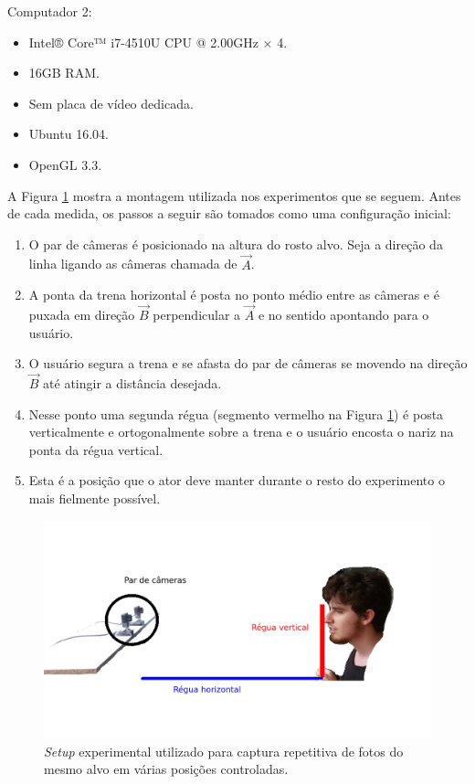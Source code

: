 Computador 2: 
\begin{itemize}
\item Intel® Core™ i7-4510U CPU @ 2.00GHz × 4.
\item 16GB RAM.
\item Sem placa de vídeo dedicada.
\item Ubuntu 16.04.
\item OpenGL 3.3.
\end{itemize}   

A Figura \ref{fig:exp-montagem} mostra a montagem utilizada nos experimentos que
se seguem. Antes de cada medida, os passos a seguir são tomados como uma
configuração inicial:

\begin{enumerate}

\item O par de câmeras é posicionado na altura do rosto alvo. Seja a direção da
  linha ligando as câmeras chamada de $\vec{A}$.

\item A ponta da trena horizontal é posta no ponto médio entre as câmeras e é
  puxada em direção $\vec{B}$ perpendicular a $\vec{A}$ e no sentido apontando
  para o usuário.

\item O usuário segura a trena e se afasta do par de câmeras se movendo na
  direção $\vec{B}$ até atingir a distância desejada.

\item Nesse ponto uma segunda régua (segmento vermelho na Figura
  \ref{fig:exp-montagem}) é posta verticalmente e ortogonalmente sobre a trena e
  o usuário encosta o nariz na ponta da régua vertical. 

\item Esta é a posição que o ator deve manter durante o resto do experimento o
  mais fielmente possível.

\end{enumerate}

\begin{figure}[!htp]
\centering
\includegraphics[width=0.8\linewidth]{figs/setupExperimento-comentado-fundo-branco.png}
\caption{\textit{Setup} experimental utilizado para captura repetitiva de fotos do mesmo alvo em várias posições controladas.}
\label{fig:exp-montagem}
\end{figure}

